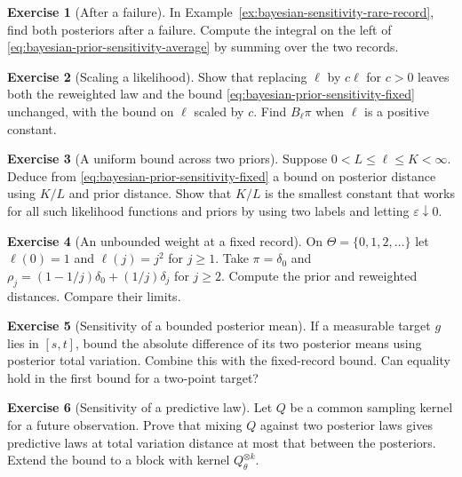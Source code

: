 \documentclass[11pt,oneside]{book}
\theoremstyle{definition}
\newtheorem{exercise}{Exercise}[section]
\theoremstyle{remark}
\begin{document}
\begin{exercise}[After a failure]
\label{exer:bayesian-sensitivity-rare-failure}
In Example~\ref{ex:bayesian-sensitivity-rare-record}, find both
posteriors after a failure. Compute the integral on the left of
\eqref{eq:bayesian-prior-sensitivity-average} by summing over the
two records.
\end{exercise}

\begin{exercise}[Scaling a likelihood]
\label{exer:bayesian-sensitivity-scale}
Show that replacing $\ell$ by $c\ell$ for $c>0$ leaves both the
reweighted law and the bound \eqref{eq:bayesian-prior-sensitivity-fixed}
unchanged, with the bound on $\ell$ scaled by $c$.
Find $B_\ell\pi$ when $\ell$ is a positive constant.
\end{exercise}

\begin{exercise}[A uniform bound across two priors]
\label{exer:bayesian-sensitivity-likelihood-bounds}
Suppose $0<L\leq\ell\leq K<\infty$. Deduce from
\eqref{eq:bayesian-prior-sensitivity-fixed} a bound on posterior
distance using $K/L$ and prior distance. Show that $K/L$ is the
smallest constant that works for all such likelihood functions
and priors by using two labels and letting $\varepsilon\downarrow0$.
\end{exercise}

\begin{exercise}[An unbounded weight at a fixed record]
\label{exer:bayesian-sensitivity-unbounded-weight}
On $\Theta=\{0,1,2,\ldots\}$ let $\ell(0)=1$ and $\ell(j)=j^2$
for $j\geq1$. Take $\pi=\delta_0$ and
$\rho_j=(1-1/j)\delta_0+(1/j)\delta_j$ for $j\geq2$.
Compute the prior and reweighted distances. Compare their limits.
\end{exercise}

\begin{exercise}[Sensitivity of a bounded posterior mean]
\label{exer:bayesian-sensitivity-bounded-target}
If a measurable target $g$ lies in $[s,t]$, bound the absolute
difference of its two posterior means using posterior total
variation. Combine this with the fixed-record bound.
Can equality hold in the first bound for a two-point target?
\end{exercise}

\begin{exercise}[Sensitivity of a predictive law]
\label{exer:bayesian-sensitivity-predictive}
Let $Q$ be a common sampling kernel for a future observation.
Prove that mixing $Q$ against two posterior laws gives
predictive laws at total variation distance at most that
between the posteriors. Extend the bound to a block with kernel
$Q_\theta^{\otimes k}$.
\end{exercise}
\end{document}
